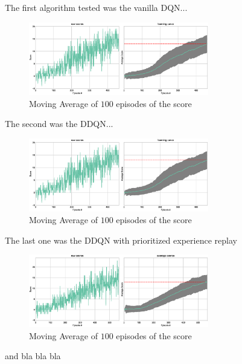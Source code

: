\documentclass[a4paper]{article}
\begin{document}
The first algorithm tested was the vanilla DQN...

\begin{figure}[ht]
\centering
\includegraphics[width=0.7\textwidth]{../notebooks/figures/2018-08-24-ddqn-learning-curve.eps}
\caption{Moving Average of $100$ episodes of the score}
\label{fig:rwd_funcs}
\end{figure}


The second was the DDQN...

\begin{figure}[ht]
\centering
\includegraphics[width=0.7\textwidth]{../notebooks/figures/2018-08-24-ddqn-learning-curve.eps}
\caption{Moving Average of $100$ episodes of the score}
\label{fig:rwd_funcs}
\end{figure}

The last one was the DDQN with prioritized experience replay


\begin{figure}[ht]
\centering
\includegraphics[width=0.7\textwidth]{../notebooks/figures/2018-08-23-ddqnpre-learning-curve.eps}
\caption{Moving Average of $100$ episodes of the score}
\label{fig:rwd_funcs}
\end{figure}


and bla bla bla
\end{document}
